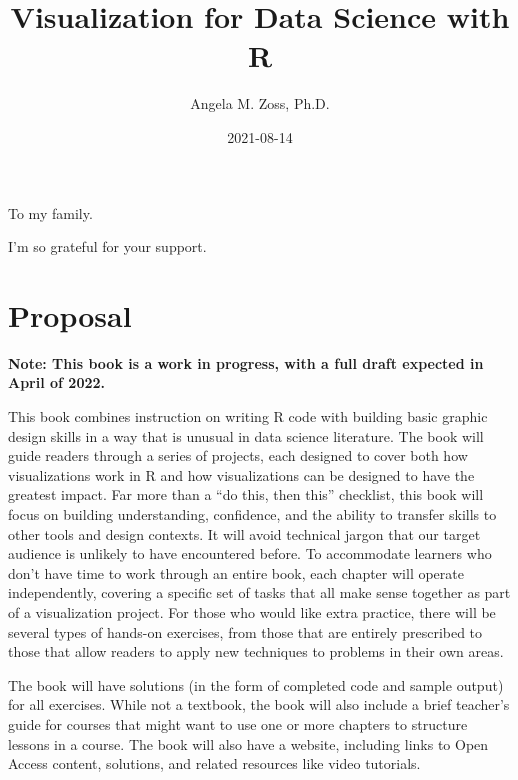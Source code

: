 \documentclass[
]{krantz}
\title{Visualization for Data Science with R}
\author{Angela M. Zoss, Ph.D.}
\date{2021-08-14}
\begin{document}
\maketitle


\thispagestyle{empty}

\begin{center}
To my family.

I'm so grateful for your support.
\end{center}

\setlength{\abovedisplayskip}{-5pt}
\setlength{\abovedisplayshortskip}{-5pt}

{
\hypersetup{linkcolor=}
\setcounter{tocdepth}{2}
\tableofcontents
}
\listoftables
\listoffigures
\hypertarget{proposal}{%
\chapter*{Proposal}\label{proposal}}


\textbf{Note: This book is a work in progress, with a full draft expected in April of 2022.}

This book combines instruction on writing R code with building basic graphic design skills in a way that is unusual in data science literature. The book will guide readers through a series of projects, each designed to cover both how visualizations work in R and how visualizations can be designed to have the greatest impact. Far more than a ``do this, then this'' checklist, this book will focus on building understanding, confidence, and the ability to transfer skills to other tools and design contexts. It will avoid technical jargon that our target audience is unlikely to have encountered before. To accommodate learners who don't have time to work through an entire book, each chapter will operate independently, covering a specific set of tasks that all make sense together as part of a visualization project. For those who would like extra practice, there will be several types of hands-on exercises, from those that are entirely prescribed to those that allow readers to apply new techniques to problems in their own areas.

The book will have solutions (in the form of completed code and sample output) for all exercises. While not a textbook, the book will also include a brief teacher's guide for courses that might want to use one or more chapters to structure lessons in a course. The book will also have a website, including links to Open Access content, solutions, and related resources like video tutorials.
\end{document}
